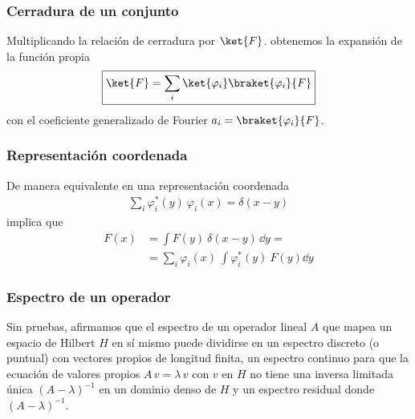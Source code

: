 \begin{frame}
\frametitle{Cerradura de un conjunto}
Multiplicando la relación de cerradura por $\ket{F}$. obtenemos la expansión de la función propia
\begin{align*}
\boxed{\ket{F} = \sum_{i} \ket{\varphi_{i}} \braket{\varphi_{i}}{F}}
\end{align*}
con el coeficiente generalizado de Fourier $a_{i} = \braket{\varphi_{i}}{F}$.
\end{frame}
\begin{frame}
\frametitle{Representación coordenada}
De manera equivalente en una representación coordenada
\begin{align*}
\boxed{\sum_{i} \varphi_{i}^{*} (y) \: \varphi_{i} (x) = \delta (x - y)}
\end{align*}
\pause
implica que
\begin{align*}
F(x) &= \int F(y) \: \delta (x {-} y) \, \dd{y} {=} \\
&= \sum_{i} \varphi_{i} (x) \: \int \varphi_{i}^{*} (y) \: F(y) \dd{y}
\end{align*}
\end{frame}
\begin{frame}
\frametitle{Espectro de un operador}
Sin pruebas, afirmamos que el espectro de un operador lineal $A$ que mapea un espacio de Hilbert $H$ en sí mismo puede dividirse en un espectro discreto (o puntual) con vectores propios de longitud finita, un espectro continuo para que la ecuación de valores propios $A \, v = \lambda \, v$ con $v$ en $H$ no tiene una inversa limitada única $(A - \lambda)^{-1}$ en un dominio denso de $H$ y un espectro residual donde $(A - \lambda)^{-1}$.
\end{frame}
